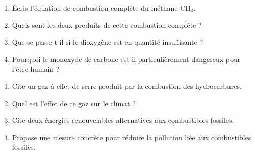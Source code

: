 \begin{enumerate}[label=\arabic*)]
\item Écris l'équation de combustion complète du méthane $\mathrm{CH_4}$.
\item Quels sont les deux produits de cette combustion complète ?
\item Que se passe-t-il si le dioxygène est en quantité insuffisante ?
\item Pourquoi le monoxyde de carbone est-il particulièrement dangereux pour l'être
humain ?
\end{enumerate}

\begin{enumerate}[label=\arabic*)]
\item Cite un gaz à effet de serre produit par la combustion des hydrocarbures.
\item Quel est l'effet de ce gaz sur le climat ?
\item Cite deux énergies renouvelables alternatives aux combustibles fossiles.
\item Propose une mesure concrète pour réduire la pollution liée aux combustibles
fossiles.
\end{enumerate}

